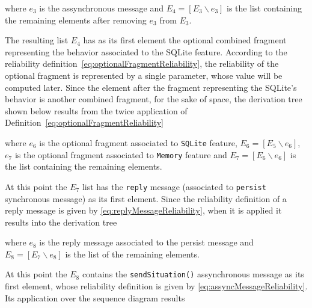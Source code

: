 
where $e_3$ is the assynchronous message and $E_4 = [E_3 \backslash e_3]$ is the list
containing the remaining elements after removing $e_3$ from $E_3$. 

The resulting list $E_4$ has as its first element the optional combined fragment
representing the behavior associated to the SQLite feature. According to the
reliability definition~\ref{eq:optionalFragmentReliability}, the reliability of the
optional fragment is represented by a single parameter, whose value will be
computed later. Since the element after the fragment representing the SQLite's
behavior is another combined fragment, for the sake of space, the derivation
tree shown below results from the twice application of
Definition~\ref{eq:optionalFragmentReliability} 


where $e_6$ is the optional fragment associated to \texttt{SQLite} feature,
$E_6=[E_5 \backslash e_6 ]$, $e_7$ is the optional fragment associated to
\texttt{Memory} feature and $E_7 = [E_6 \backslash e_6]$ is the list containing
the remaining elements. 

At this point the $E_7$ list has the \texttt{reply} message (associated to
\texttt{persist} synchronous message) as its first element. Since the
reliability definition of a reply message is given by
\ref{eq:replyMessageReliability}, when it is applied it results into the
derivation tree


where $e_8$ is the reply message associated to the persist message and $E_8 =
[E_7 \backslash e_8]$ is the list of the remaining elements. 

At this point the $E_8$ contains the \texttt{sendSituation()} assynchronous
message as its first element, whose reliability definition is given by
\ref{eq:assyncMessageReliability}. Its application over the sequence diagram
results 


